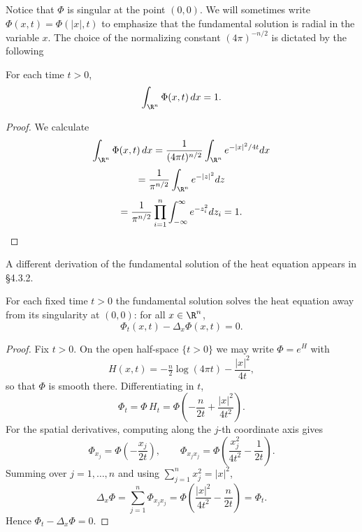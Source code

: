 Notice that $\Phi$ is singular at the point $(0,0)$. We will sometimes write $\Phi(x,t) = \Phi(|x|,t)$ to emphasize that the fundamental solution is radial in the variable $x$. The choice of the normalizing constant $(4\pi)^{-n/2}$ is dictated by the following

\begin{lemma}
\label{lem:integral-fundamental-solution-heat}
\leanok
{}
For each time $t > 0$,
$$\int_{\R^n} \Phi(x,t) \, dx = 1.$$
\end{lemma}

\begin{proof}
\leanok
We calculate
$$\int_{\R^n} \Phi(x,t) \, dx = \frac{1}{(4\pi t)^{n/2}} \int_{\R^n} e^{-|x|^2/4t} dx$$
$$= \frac{1}{\pi^{n/2}} \int_{\R^n} e^{-|z|^2} dz$$
$$= \frac{1}{\pi^{n/2}} \prod_{i=1}^{n} \int_{-\infty}^{\infty} e^{-z_i^2} dz_i = 1. \qedhere$$
\end{proof}

A different derivation of the fundamental solution of the heat equation appears in \S 4.3.2.

\begin{lemma}
\label{lem:heat-kernel-solves-heat-equation}
\leanok
{}
For each fixed time $t > 0$ the fundamental solution solves the heat equation away
from its singularity at $(0,0)$: for all $x \in \R^n$,
$$\Phi_t(x,t) - \Delta_x \Phi(x,t) = 0.$$
\end{lemma}

\begin{proof}
\leanok
Fix $t>0$. On the open half-space $\{t>0\}$ we may write $\Phi = e^{H}$ with
$$H(x,t) = -\tfrac{n}{2}\log(4\pi t) - \frac{|x|^2}{4t},$$
so that $\Phi$ is smooth there. Differentiating in $t$,
$$\Phi_t = \Phi \, H_t = \Phi\left(-\frac{n}{2t} + \frac{|x|^2}{4t^2}\right).$$
For the spatial derivatives, computing along the $j$-th coordinate axis gives
$$\Phi_{x_j} = \Phi\left(-\frac{x_j}{2t}\right), \qquad
  \Phi_{x_j x_j} = \Phi\left(\frac{x_j^2}{4t^2} - \frac{1}{2t}\right).$$
Summing over $j = 1, \ldots, n$ and using $\sum_{j=1}^n x_j^2 = |x|^2$,
$$\Delta_x \Phi = \sum_{j=1}^n \Phi_{x_j x_j}
  = \Phi\left(\frac{|x|^2}{4t^2} - \frac{n}{2t}\right) = \Phi_t.$$
Hence $\Phi_t - \Delta_x \Phi = 0$.
\end{proof}

